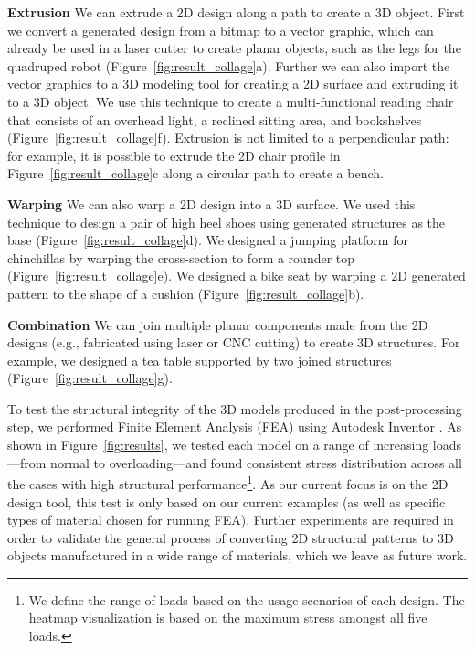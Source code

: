 \textbf{Extrusion} We can extrude a 2D design along a path to create a 3D object. First we convert a generated design from a bitmap to a vector graphic, which can already be used in a laser cutter to create planar objects, such as the legs for the quadruped robot (Figure~\ref{fig:result_collage}a). Further we can also import the vector graphics to a 3D modeling tool for creating a 2D surface and extruding it to a 3D object. We use this technique to create a multi-functional reading chair that consists of an overhead light, a reclined sitting area, and bookshelves (Figure~\ref{fig:result_collage}f). Extrusion is not limited to a perpendicular path: for example, it is possible to extrude the 2D chair profile in Figure~\ref{fig:result_collage}c along a circular path to create a bench.


\textbf{Warping} We can also warp a 2D design into a 3D surface. We used this technique to design a pair of high heel shoes using generated structures as the base (Figure~\ref{fig:result_collage}d). We designed a jumping platform for chinchillas by warping the cross-section to form a rounder top (Figure~\ref{fig:result_collage}e). We designed a bike seat by warping a 2D generated pattern to the shape of a cushion (Figure~\ref{fig:result_collage}b).


\textbf{Combination} We can join multiple planar components made from the 2D designs (e.g., fabricated using laser or CNC cutting) to create 3D structures. For example, we designed a tea table supported by two joined structures (Figure~\ref{fig:result_collage}g).




To test the structural integrity of the 3D models produced in the post-processing step, we performed Finite Element Analysis (FEA) using Autodesk Inventor \cite{AboutSha59:online}. As shown in Figure~\ref{fig:results}, we tested each model on a range of increasing loads---from normal to overloading---and found consistent stress distribution across all the cases with high structural performance\footnote{We define the range of loads based on the usage scenarios of each design. The heatmap visualization is based on the maximum stress amongst all five loads.}. As our current focus is on the 2D design tool, this test is only based on our current examples (as well as specific types of material chosen for running FEA). Further experiments are required in order to validate the general process of converting 2D structural patterns to 3D objects manufactured in a wide range of materials, which we leave as future work.

